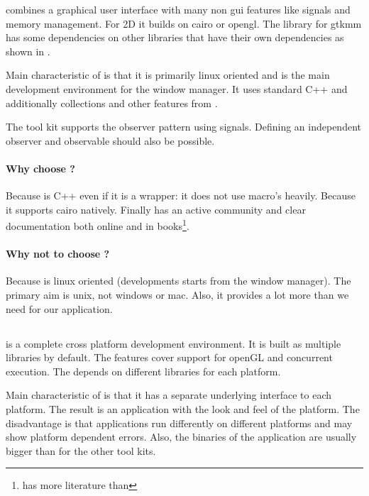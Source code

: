  combines a graphical user interface with many non gui features like
signals and memory management. For 2D it builds on cairo or opengl. The library
for gtkmm has some dependencies on other libraries that have their own
dependencies as shown in \cite{gtkmm:gtk+-dep}.

Main characteristic of  is that it is primarily linux oriented and is
the main development environment for the  window manager. It uses
standard C++ and additionally collections and other features from .

The tool kit  supports the observer pattern using signals. Defining an
independent observer and observable should also be possible.

\paragraph{Why choose ?} Because  is C++ even if it is a
wrapper: it does not use macro's heavily. Because it supports cairo natively.
Finally  has an active community and clear documentation both online
and in books\footnote{ has more literature than }.

\paragraph{Why not to choose ?} Because  is linux oriented
(developments starts from the  window manager). The primary aim is
unix, not windows or mac.  Also, it provides a lot more than we need for our
application.

\subsection{} 

 is a complete cross platform development environment. It is built
as multiple libraries by default. The features cover support for openGL and
concurrent execution. The  depends on different libraries for each
platform.

Main characteristic of  is that it has a separate underlying
interface to each platform. The result is an application with the look and feel
of the platform. The disadvantage is that applications run differently on
different platforms and may show platform dependent errors. Also, the binaries
of the application are usually bigger than for the other tool kits.

